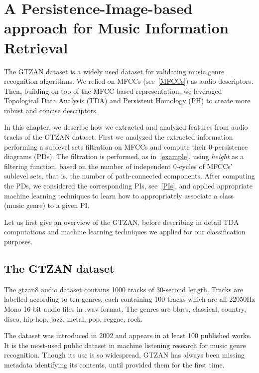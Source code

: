 \documentclass[english, LaM, oneside, noexaminfo]{sapthesis}
\begin{document}
\chapter{A Persistence-Image-based approach for Music Information Retrieval}\label{ch:MIR}

The GTZAN dataset \cite{tzanetakis2002musical} is a widely used dataset for validating music genre recognition algorithms. We relied on MFCCs (see~\cref{MFCCs}) as audio descriptors. Then, building on top of the MFCC-based representation, we leveraged Topological Data Analysis (TDA) and Persistent Homology (PH) to create more robust and concise descriptors.

In this chapter, we describe how we extracted and analyzed features from audio tracks of the GTZAN dataset. First we analyzed the extracted information performing a sublevel sets filtration on MFCCs and compute their $0$-persistence diagrams (PDs). The filtration is performed, as in~\cref{example}, using \textit{height} as a filtering function, based on the number of independent $0$-cycles of MFCCs' sublevel sets, that is, the number of path-connected components. After computing the PDs, we considered the corresponding PIs, see~\cref{PIs}, and applied appropriate machine learning techniques to learn how to appropriately associate a class (music genre) to a given PI.  

Let us first give an overview of the GTZAN, before describing in detail TDA computations and machine learning techniques we applied for our classification purposes.



\section{The GTZAN dataset}



The gtzan8 audio dataset \cite{tzanetakis2002musical} contains 1000 tracks of 30-second length. Tracks are labelled according to ten genres, each containing 100 tracks which are all 22050Hz Mono 16-bit audio files in .wav format. The genres are blues, classical, country, disco, hip-hop, jazz, metal, pop, reggae, rock.

The dataset was introduced in 2002 and appears in at least 100 published works. It is the most-used public dataset in machine listening research for music genre recognition. Though its use is so widespread, GTZAN has always been missing metadata identifying its contents, until \cite{sturm2012analysis} provided them for the first time.
\end{document}
